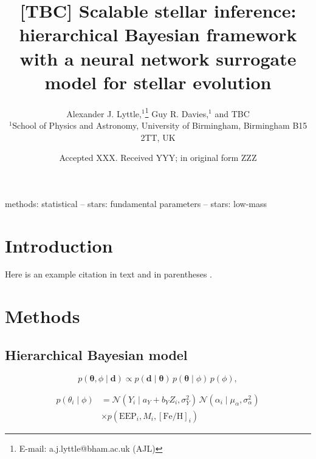 \documentclass[fleqn,usenatbib]{mnras}
\title[Scalable stellar inference]{[TBC] Scalable stellar inference: hierarchical Bayesian framework with a neural network surrogate model for stellar evolution}
\author[A. J. Lyttle et al.]{
Alexander J. Lyttle,$^{1}$\thanks{E-mail: a.j.lyttle@bham.ac.uk (AJL)}
Guy R. Davies,$^{1}$
and TBC
\\
$^{1}$School of Physics and Astronomy, University of Birmingham, Birmingham B15 2TT, UK
}
\date{Accepted XXX. Received YYY; in original form ZZZ}
\newcommand{\eep}{\ensuremath{\mathrm{EEP}}}
\newcommand{\feh}{\ensuremath{\mathrm{[Fe/H]}}}
\newcommand{\normal}{\mathcal{N}}
\renewcommand*{\vec}[1]{\boldsymbol{#1}}
\begin{document}
\label{firstpage}
\pagerange{\pageref{firstpage}--\pageref{lastpage}}
\maketitle

\begin{abstract}

\end{abstract}

\begin{keywords}
methods: statistical -- stars: fundamental parameters -- stars: low-mass
\end{keywords}



\section{Introduction}

Here is an example citation in text \citet{Lyttle.Davies.ea2021} and in parentheses \citep{Lyttle.Davies.ea2021}.

\section{Methods}
\label{sec:methods}

\subsection{Hierarchical Bayesian model}
\label{sec:hbm}

\begin{equation}
    p(\vec{\theta}, \phi \mid \vec{d}) \propto p(\vec{d} \mid \vec{\theta}) \, p(\vec{\theta} \mid \phi) \, p(\phi),
\end{equation}

\begin{equation}
    \begin{split}
        p(\theta_i \mid \phi) &= \normal(Y_i \mid a_Y + b_Y Z_i, \sigma_Y^2) \, \normal(\alpha_i \mid \mu_\alpha, \sigma_\alpha^2) \\
        &\times p(\eep_i, M_i, \feh_i)
    \end{split}
\end{equation}
\end{document}
